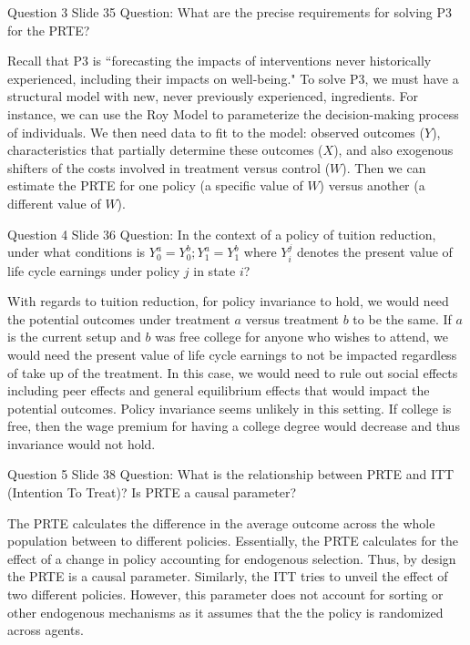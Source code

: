 \documentclass{article}
\begin{document}
\begin{problem}{Question 3 Slide 35}
Question: What are the precise requirements for solving P3 for the PRTE?
\end{problem}
\begin{solution}
Recall that P3 is ``forecasting the impacts of interventions never historically experienced, including their impacts on well-being." To solve P3, we must have a structural model with new, never previously experienced, ingredients. For instance, we can use the Roy Model to parameterize the decision-making process of individuals. We then need data to fit to the model: observed outcomes ($Y$), characteristics that partially determine these outcomes ($X$), and also exogenous shifters of the costs involved in treatment versus control ($W$). Then we can estimate the PRTE for one policy (a specific value of $W$) versus another (a different value of $W$).
\end{solution}
 
\begin{problem}{Question 4 Slide 36}
Question: In the context of a policy of tuition reduction, under what conditions is $Y^a_0 = Y^b_0; Y^a_1 = Y^b_1$ where $Y_i^j$ denotes the present value of life cycle earnings under policy $j$ in state $i$?
\end{problem}
\begin{solution}
With regards to tuition reduction, for policy invariance to hold, we would need the potential outcomes under treatment $a$ versus treatment $b$ to be the same. If $a$ is the current setup and $b$ was free college for anyone who wishes to attend, we would need the present value of life cycle earnings to not be impacted regardless of take up of the treatment. In this case, we would need to rule out social effects including peer effects and general equilibrium effects that would impact the potential outcomes. Policy invariance seems unlikely in this setting. If college is free, then the wage premium for having a college degree would decrease and thus invariance would not hold. 
\end{solution}

\begin{problem}{Question 5 Slide 38}
Question: What is the relationship between PRTE and ITT (Intention To Treat)? Is PRTE a causal parameter?
\end{problem}
\begin{solution}
The PRTE calculates the difference in the average outcome across the whole population between to different policies. Essentially, the PRTE calculates for the effect of a change in policy accounting for endogenous selection. Thus, by design the PRTE is a causal parameter. Similarly, the ITT tries to unveil the effect of two different policies. However, this parameter does not account for sorting or other endogenous mechanisms as it assumes that the the policy is randomized across agents. 
\end{solution}
\end{document}
